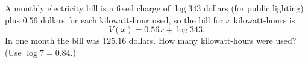 A monthly electricity bill is a fixed charge of $\log343$ dollars (for public lighting) plus $0.56$ dollars for each kilowatt-hour used, so the bill for $x$ kilowatt-hours is
\[V(x)=0.56x+\log343 .\]
In one month the bill was $125.16$ dollars. How many kilowatt-hours were used? (Use $\log7=0.84$.)
